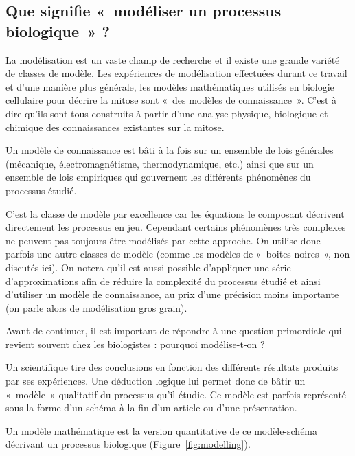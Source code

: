\documentclass[12pt,a4paper,twoside,openright]{book}
\begin{document}
\subsection{Que signifie «~modéliser un processus biologique~»
?}\label{que-signifie-moduxe9liser-un-processus-biologique}

La modélisation est un vaste champ de recherche et il existe une grande
variété de classes de modèle. Les expériences de modélisation effectuées
durant ce travail et d'une manière plus générale, les modèles
mathématiques utilisés en biologie cellulaire pour décrire la mitose
sont «~des modèles de connaissance~». C'est à dire qu'ils sont tous
construits à partir d'une analyse physique, biologique et chimique des
connaissances existantes sur la mitose.

Un modèle de connaissance est bâti à la fois sur un ensemble de lois
générales (mécanique, électromagnétisme, thermodynamique, etc.) ainsi
que sur un ensemble de lois empiriques qui gouvernent les différents
phénomènes du processus étudié.

C'est la classe de modèle par excellence car les équations le composant
décrivent directement les processus en jeu. Cependant certains
phénomènes très complexes ne peuvent pas toujours être modélisés par
cette approche. On utilise donc parfois une autre classes de modèle
(comme les modèles de «~boites noires~», non discutés ici). On notera
qu'il est aussi possible d'appliquer une série d'approximations afin de
réduire la complexité du processus étudié et ainsi d'utiliser un modèle
de connaissance, au prix d'une précision moins importante (on parle
alors de modélisation gros grain).

Avant de continuer, il est important de répondre à une question
primordiale qui revient souvent chez les biologistes : pourquoi
modélise-t-on ?

Un scientifique tire des conclusions en fonction des différents
résultats produits par ses expériences. Une déduction logique lui permet
donc de bâtir un «~modèle~» qualitatif du processus qu'il étudie. Ce
modèle est parfois représenté sous la forme d'un schéma à la fin d'un
article ou d'une présentation.

Un modèle mathématique est la version quantitative de ce modèle-schéma
décrivant un processus biologique (Figure~\ref{fig:modelling}).
\end{document}
